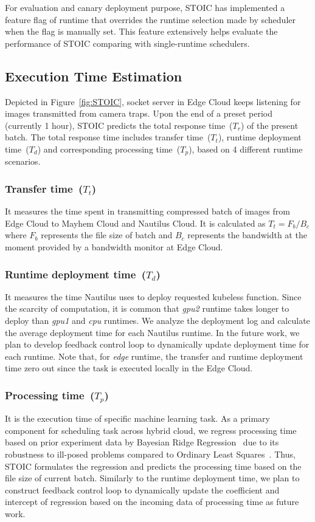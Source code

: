  For evaluation and canary deployment purpose, STOIC has implemented a feature flag of runtime that overrides the runtime selection made by scheduler when the flag is manually set. This feature extensively helps evaluate the performance of STOIC comparing with single-runtime schedulers.
 
 
 \subsection{Execution Time Estimation}
 Depicted in Figure~\ref{fig:STOIC}, socket server in Edge Cloud keeps listening for images transmitted from camera traps. Upon the end of a preset period (currently 1 hour), STOIC predicts the total response time~($T_r$) of the present batch. The total response time includes transfer time~($T_t$), runtime deployment time~($T_d$) and corresponding processing time~($T_p$), based on 4 different runtime scenarios. 
 
 \subsubsection{Transfer time~($T_t$)} It measures the time spent in transmitting compressed batch of images from Edge Cloud to Mayhem Cloud and Nautilus Cloud. It is calculated as ${T_t = F_b / B_c}$ where $F_b$ represents the file size of batch and $B_c$ represents the bandwidth at the moment provided by a bandwidth monitor at Edge Cloud. 
 
 \subsubsection{Runtime deployment time~($T_d$)} It measures the time Nautilus uses to deploy requested kubeless function. Since the scarcity of computation, it is common that \textit{gpu2} runtime takes longer to deploy than \textit{gpu1} and \textit{cpu} runtimes. We analyze the deployment log and calculate the average deployment time for each Nautilus runtime. In the future work, we plan to develop feedback control loop to dynamically update deployment time for each runtime. Note that, for \textit{edge} runtime, the transfer and runtime deployment time zero out since the task is executed locally in the Edge Cloud.
 
 \subsubsection{Processing time~($T_p$)} It is the execution time of specific machine learning task. As a primary component for scheduling task across hybrid cloud, we regress processing time based on prior experiment data by Bayesian Ridge Regression~\cite{ref:brr} due to its robustness to ill-posed problems compared to Ordinary Least Squares~\cite{ref:ols}. Thus, STOIC formulates the regression and predicts the processing time based on the file size of current batch. Similarly to the runtime deployment time, we plan to construct feedback control loop to dynamically update the coefficient and intercept of regression based on the incoming data of processing time as future work.
 
